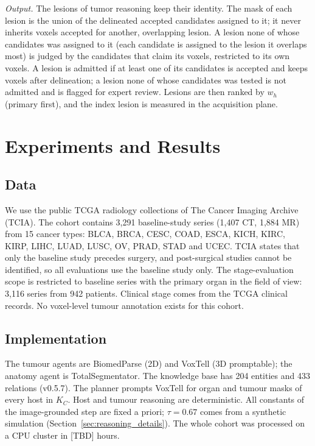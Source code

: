 \documentclass[fleqn,10pt]{olplainarticle}
\begin{document}
\textit{Output.} The lesions of tumor reasoning keep their identity. The mask of each lesion is the union of the delineated
accepted candidates assigned to it; it never inherits voxels accepted for another, overlapping lesion. A lesion none of
whose candidates was assigned to it (each candidate is assigned to the lesion it overlaps most) is judged by the candidates
that claim its voxels, restricted to its own voxels. A lesion is admitted if at least one of its candidates is accepted and
keeps voxels after delineation; a lesion none of whose candidates was tested is not admitted and is flagged for expert
review. Lesions are then ranked by $w_h$ (primary first), and the index lesion is measured in the acquisition plane.


\section{Experiments and Results}
\label{sec:results}

\subsection{Data}
We use the public TCGA radiology collections of The Cancer Imaging Archive (TCIA). The cohort contains 3{,}291
baseline-study series (1{,}407 CT, 1{,}884 MR) from 15 cancer types: BLCA, BRCA, CESC, COAD, ESCA, KICH, KIRC, KIRP,
LIHC, LUAD, LUSC, OV, PRAD, STAD and UCEC. TCIA states that only the baseline study precedes surgery, and post-surgical
studies cannot be identified, so all evaluations use the baseline study only. The stage-evaluation scope is restricted
to baseline series with the primary organ in the field of view: 3{,}116 series from 942 patients. Clinical stage comes
from the TCGA clinical records. No voxel-level tumour annotation exists for this cohort.

\subsection{Implementation}
The tumour agents are BiomedParse (2D) and VoxTell (3D promptable); the anatomy agent is TotalSegmentator. The
knowledge base has 204 entities and 433 relations (v0.5.7). The planner prompts VoxTell for organ and tumour masks of
every host in $K_C$. Host and tumour reasoning are deterministic. All constants of the image-grounded step are fixed a
priori; $\tau=0.67$ comes from a synthetic simulation (Section~\ref{sec:reasoning_details}). The whole cohort was
processed on a CPU cluster in [TBD] hours.
\end{document}
